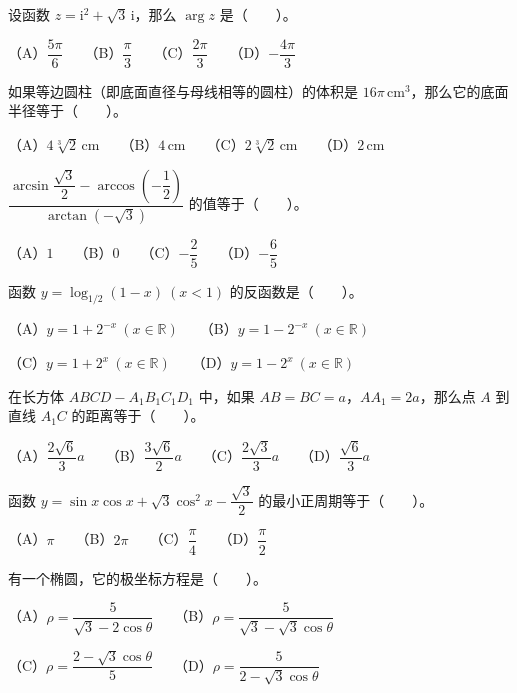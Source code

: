\begin{question}
设函数 $z=\mathrm{i}^2+\sqrt3\,\mathrm{i}$，那么 $\arg z$ 是\mbox{（　　）}。

（A）$\dfrac{5\pi}{6}$　　（B）$\dfrac{\pi}{3}$　　（C）$\dfrac{2\pi}{3}$　　（D）$-\dfrac{4\pi}{3}$

\end{question}
\begin{question}
如果等边圆柱（即底面直径与母线相等的圆柱）的体积是 $16\pi\,\mathrm{cm}^3$，那么它的底面半径等于\mbox{（　　）}。

（A）$4\sqrt[3]{2}\,\mathrm{cm}$　　（B）$4\,\mathrm{cm}$　　（C）$2\sqrt[3]{2}\,\mathrm{cm}$　　（D）$2\,\mathrm{cm}$

\end{question}
\begin{question}
$\dfrac{\arcsin\dfrac{\sqrt3}{2}-\arccos\left(-\dfrac12\right)}{\arctan(-\sqrt3)}$ 的值等于\mbox{（　　）}。

（A）$1$　　（B）$0$　　（C）$-\dfrac25$　　（D）$-\dfrac65$

\end{question}
\begin{question}
函数 $y=\log_{1/2}(1-x)\ (x<1)$ 的反函数是\mbox{（　　）}。

（A）$y=1+2^{-x}\ (x\in\mathbb R)$　　（B）$y=1-2^{-x}\ (x\in\mathbb R)$

（C）$y=1+2^x\ (x\in\mathbb R)$　　（D）$y=1-2^x\ (x\in\mathbb R)$

\end{question}
\begin{question}
在长方体 $ABCD-A_1B_1C_1D_1$ 中，如果 $AB=BC=a$，$AA_1=2a$，那么点 $A$ 到直线 $A_1C$ 的距离等于\mbox{（　　）}。

（A）$\dfrac{2\sqrt6}{3}a$　　（B）$\dfrac{3\sqrt6}{2}a$　　（C）$\dfrac{2\sqrt3}{3}a$　　（D）$\dfrac{\sqrt6}{3}a$

\end{question}
\begin{question}
函数 $y=\sin x\cos x+\sqrt3\cos^2x-\dfrac{\sqrt3}{2}$ 的最小正周期等于\mbox{（　　）}。

（A）$\pi$　　（B）$2\pi$　　（C）$\dfrac\pi4$　　（D）$\dfrac\pi2$

\end{question}
\begin{question}
有一个椭圆，它的极坐标方程是\mbox{（　　）}。

（A）$\rho=\dfrac5{\sqrt3-2\cos\theta}$　　（B）$\rho=\dfrac5{\sqrt3-\sqrt3\cos\theta}$

（C）$\rho=\dfrac{2-\sqrt3\cos\theta}{5}$　　（D）$\rho=\dfrac5{2-\sqrt3\cos\theta}$

\end{question}
